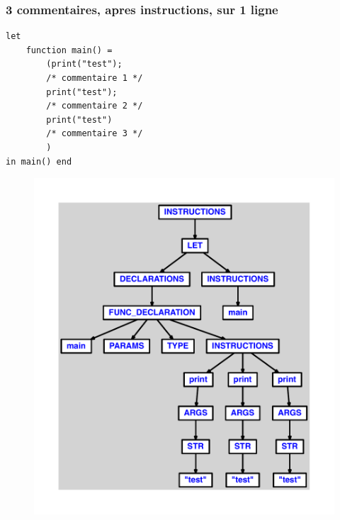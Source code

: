\documentclass{article}
\begin{document}
\subsubsection{3 commentaires, apres instructions, sur 1 ligne}
\begin{lstlisting}
let
	function main() =
		(print("test");
		/* commentaire 1 */
		print("test");
		/* commentaire 2 */
		print("test")
		/* commentaire 3 */
		)
in main() end
\end{lstlisting}
\newpage
\begin{figure}[H]
\centering
\includegraphics[max width=\textwidth]{ast/ast_160.pdf}
\end{figure}
\newpage
\end{document}
